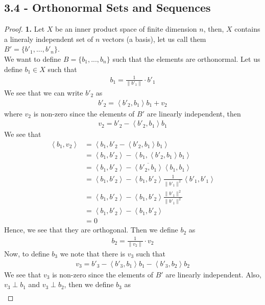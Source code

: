 \documentclass[11pt]{article}
\newcommand{\inprd}[1]{\left\langle{#1}\right\rangle}
\theoremstyle{definition}
\begin{document}
\cleardoublepage
\subsection*{3.4 - Orthonormal Sets and Sequences}
\begin{proof}{\textbf{1.}}
Let $X$ be an inner product space of finite dimension $n$, then, $X$ contains 
a lineraly independent set of $n$ vectors (a basis), let us call them
$B' = \{b'_1, ..., b'_n\}$.
\\
We want to define $B = \{b_1, ..., b_n\}$ such that the elements are
orthonormal. Let us define $b_1 \in X$ such that
\begin{align*}
    b_1 = \frac{1}{\|b'_1\|}\cdot b'_1
\end{align*}
We see that we can write $b'_2$ as
\begin{align*}
    b'_2 = \inprd{b'_2, b_1}b_1 + v_2
\end{align*}
where $v_2$ is non-zero since the elements of $B'$ are linearly independent,
then
\begin{align*}
    v_2 = b'_2 - \inprd{b'_2, b_1}b_1
\end{align*}
We see that
\begin{align*}
    \inprd{b_1, v_2} &= \inprd{b_1, b'_2 - \inprd{b'_2, b_1}b_1}\\
    &= \inprd{b_1, b'_2} - \inprd{b_1, \inprd{b'_2, b_1}b_1}\\
    &= \inprd{b_1, b'_2} - \overline{\inprd{b'_2, b_1}}\inprd{b_1, b_1}\\
    &= \inprd{b_1, b'_2} - \inprd{b_1, b'_2}\frac{1}{\|b'_1\|^2}\inprd{b'_1, b'_1}\\
    &= \inprd{b_1, b'_2} - \inprd{b_1, b'_2}\frac{\|b'_1\|^2}{\|b'_1\|^2}\\
    &= \inprd{b_1, b'_2} - \inprd{b_1, b'_2}\\
    &= 0
\end{align*}
Hence, we see that they are orthogonal. Then we define $b_2$ as
\begin{align*}
    b_2 = \frac{1}{\|v_2\|}\cdot v_2
\end{align*}
Now, to define $b_3$ we note that there is $v_3$ such that
\begin{align*}
    v_3 = b'_3 -\inprd{b'_3, b_1}b_1 - \inprd{b'_3, b_2}b_2
\end{align*}
We see that $v_3$ is non-zero since the elements of $B'$ are linearly
independent. Also, $v_3 \perp b_1$ and $v_3 \perp b_2$, then we define $b_3$ 
as
\begin{align*}

\end{align*}
\end{proof}
\end{document}
